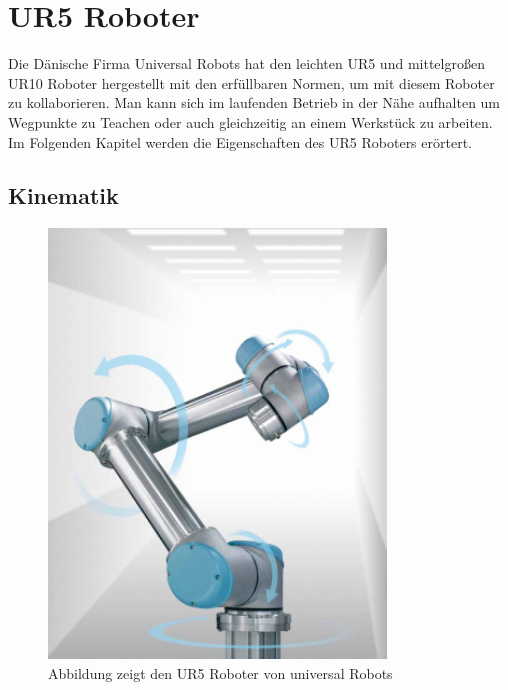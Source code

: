 \section{UR5 Roboter}
\label{sec:ur_robot_gru}

Die Dänische Firma Universal Robots hat den leichten UR5 und mittelgroßen UR10 Roboter hergestellt mit den erfüllbaren Normen, um mit diesem Roboter zu kollaborieren. Man kann sich im laufenden Betrieb in der Nähe aufhalten um Wegpunkte zu Teachen oder auch gleichzeitig an einem Werkstück zu arbeiten. 
Im Folgenden Kapitel werden die Eigenschaften des UR5 Roboters erörtert.

\subsection{Kinematik}
\label{ur_eigenschaften_gru}

\begin{figure}[ht]
  \centering
    \includegraphics[width=0.8\textwidth]{pic/ur5_robot.png}
      \caption[UR5 Roboter]{Abbildung zeigt den UR5 Roboter von universal Robots}
      \label{fig:schnittstellen_schichten}
\end{figure}

